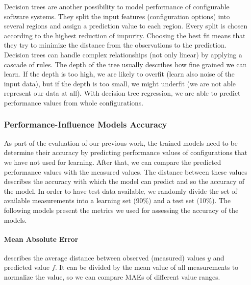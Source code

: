 Decision trees are another possibility to model performance of configurable software systems. They split the input features (configuration options) into several regions and assign a prediction value to each region. Every split is chosen according to the highest reduction of impurity. Choosing the best fit means that they try to minimize the distance from the observations to the prediction. Decision trees can handle complex relationships (not only linear) by applying a cascade of rules. The depth of the tree usually describes how fine grained we can learn. If the depth is too high, we are likely to overfit (learn also noise of the input data), but if the depth is too small, we might underfit (we are not able represent our data at all). With decision tree regression, we are able to predict performance values from whole configurations.


\subsubsection{Performance-Influence Models Accuracy}
As part of the evaluation of our previous work, the trained models need to be determine their accuracy by predicting performance values of configurations that we have not used for learning. After that, we can compare the predicted performance values with the measured values. The distance between these values describes the accuracy with which the model can predict and so the accuracy of the model. In order to have test data available, we randomly divide the set of available measurements into a learning set (90\%) and a test set (10\%). The following models present the metrics we used for assessing the accuracy of the models. 

\paragraph{Mean Absolute Error} 
describes the average distance between observed (measured) values $y$ and predicted value $f$. It can be divided by the mean value of all measurements to normalize the value, so we can compare MAEs of different value ranges.

